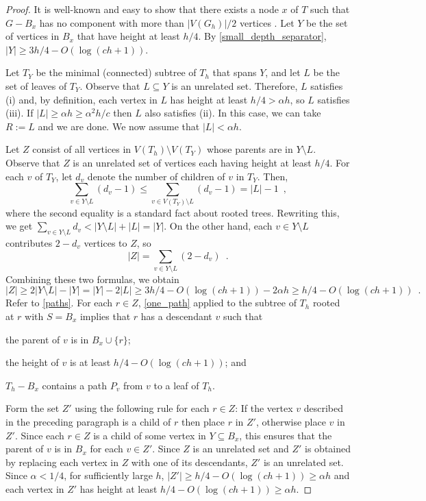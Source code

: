 \documentclass{patmorin}
\renewcommand{\le}{\leqslant}
\renewcommand{\ge}{\geqslant}
\begin{document}
\begin{proof}
  It is well-known and easy to show that there exists a node $x$ of $T$ such that $G-B_x$ has no component with more than $|V(G_h)|/2$ vertices \cite[(2.6)]{robertson.seymour:graph}. Let $Y$ be the set of vertices in $B_x$ that have height at least $h/4$.  By \cref{small_depth_separator}, $|Y|\ge 3h/4 - O(\log (ch+1))$.

  Let $T_Y$ be the minimal (connected) subtree of $T_h$ that spans $Y$, and let $L$ be the set of leaves of $T_Y$.  Observe that $L\subseteq Y$ is an unrelated set. Therefore, $L$ satisfies (i) and, by definition, each vertex in $L$ has height at least $h/4 > \alpha h$, so $L$ satisfies (iii).  If $|L|\ge \alpha h \ge \alpha^2 h/c$ then $L$ also satisfies (ii).  In this case, we can take $R:=L$ and we are done.  We now assume that $|L|< \alpha h$.

  Let $Z$ consist of all vertices in $V(T_h)\setminus V(T_Y)$ whose parents are in $Y\setminus L$.   Observe that $Z$ is an unrelated set of vertices each having height at least $h/4$. For each $v$ of $T_Y$, let $d_v$ denote the number of children of $v$ in $T_Y$.  Then,
  \[
     \sum_{v\in Y\setminus L} (d_v-1)
     \le \sum_{v\in V(T_Y)\setminus L} (d_v-1)
     = |L|-1 \enspace ,
  \]
  where the second equality is a standard fact about rooted trees.
  Rewriting this, we get $\sum_{v\in Y\setminus L} {d_v} < |Y\setminus L| + |L| = |Y|$.  On the other hand, each $v\in Y\setminus L$ contributes $2-d_v$ vertices to $Z$, so
  \[
    |Z| = \sum_{v\in Y\setminus L} (2-d_v) \enspace .
  \]
  Combining these two formulas, we obtain
  \[
    |Z| \ge 2|Y\setminus L| - |Y| = |Y| - 2|L|
    \ge 3h/4-O(\log(ch+1)) - 2\alpha h
    \ge h/4-O(\log(ch+1)) \enspace .
  \]
  Refer to \cref{paths}.  For each $r\in Z$, \cref{one_path} applied to the subtree of $T_h$ rooted at $r$ with $S=B_x$ implies that $r$ has a descendant $v$ such that
  \begin{inparaenum}[(a)]
    \item the parent of $v$ is in $B_x\cup\{r\}$;
    \item the height of $v$ is at least $h/4-O(\log(ch+1))$; and
    \item $T_h-B_x$ contains a path $P_{v}$ from $v$ to a leaf of $T_h$.
  \end{inparaenum}

  Form the set $Z'$ using the following rule for each $r\in Z$: If the vertex $v$ described in the preceding paragraph is a child of $r$ then place $r$ in $Z'$, otherwise place $v$ in $Z'$. Since each $r\in Z$ is a child of some vertex in $Y\subseteq B_x$, this ensures that the parent of $v$ is in $B_x$ for each $v\in Z'$.  Since $Z$ is an unrelated set and $Z'$ is obtained by replacing each vertex in $Z$ with one of its descendants, $Z'$ is an unrelated set.  Since $\alpha < 1/4$, for sufficiently large $h$, $|Z'|\ge h/4 - O(\log(ch+1)) \ge \alpha h$ and each vertex in $Z'$ has height at least $h/4 - O(\log(ch+1)) \ge \alpha h$.


\end{proof}
\end{document}
